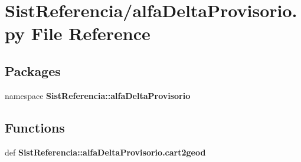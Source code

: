 \section{\-Sist\-Referencia/alfa\-Delta\-Provisorio.py \-File \-Reference}
\label{alfa_delta_provisorio_8py}
\subsection*{\-Packages}
\begin{DoxyCompactItemize}
\item 
namespace {\bf \-Sist\-Referencia\-::alfa\-Delta\-Provisorio}
\end{DoxyCompactItemize}
\subsection*{\-Functions}
\begin{DoxyCompactItemize}
\item 
def {\bf \-Sist\-Referencia\-::alfa\-Delta\-Provisorio.\-cart2geod}
\end{DoxyCompactItemize}
